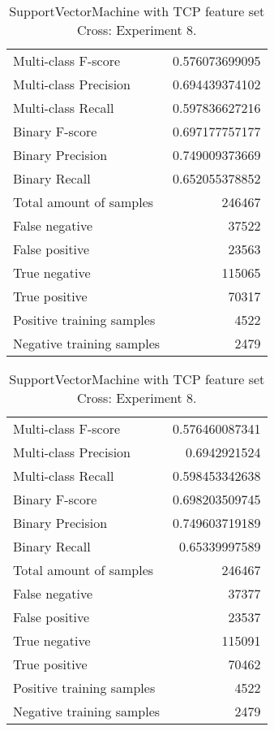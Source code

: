 \begin{table}[H]
\begin{minipage}{0.5\textwidth}
\caption{SupportVectorMachine with TCP feature set Cross: Experiment 7.}
\centering
\begin{tabular}{l r}
\toprule
Multi-class F-score & 0.576073699095 \\
Multi-class Precision & 0.694439374102 \\
Multi-class Recall & 0.597836627216 \\
\midrule
Binary F-score & 0.697177757177 \\
Binary Precision & 0.749009373669 \\
Binary Recall & 0.652055378852 \\
\midrule
Total amount of samples & 246467 \\
False negative & 37522 \\
False positive & 23563 \\
True negative & 115065 \\
True positive & 70317 \\
\midrule
Positive training samples & 4522 \\
Negative training samples & 2479 \\
\bottomrule
\end{tabular}
\end{minipage}
\hfillx
\begin{minipage}{0.5\textwidth}
\caption{SupportVectorMachine with TCP feature set Cross: Experiment 8.}
\centering
\begin{tabular}{l r}
\toprule
Multi-class F-score & 0.576460087341 \\
Multi-class Precision & 0.6942921524 \\
Multi-class Recall & 0.598453342638 \\
\midrule
Binary F-score & 0.698203509745 \\
Binary Precision & 0.749603719189 \\
Binary Recall & 0.65339997589 \\
\midrule
Total amount of samples & 246467 \\
False negative & 37377 \\
False positive & 23537 \\
True negative & 115091 \\
True positive & 70462 \\
\midrule
Positive training samples & 4522 \\
Negative training samples & 2479 \\
\bottomrule
\end{tabular}
\end{minipage}
\end{table}
